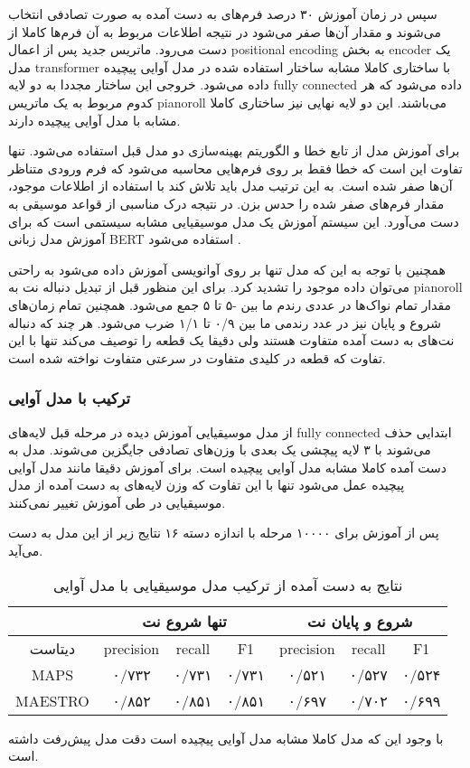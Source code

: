 سپس در زمان آموزش ۳۰ درصد فرم‌های به دست آمده به صورت تصادفی انتخاب می‌شوند و
مقدار آن‌ها صفر می‌شود در نتیجه اطلاعات مربوط به آن فرم‌ها کاملا از دست می‌رود.
ماتریس جدید پس از اعمال \gls{positional encoding} به بخش \gls{encoder} یک مدل
\gls{transformer} با ساختاری کاملا مشابه ساختار استفاده شده در مدل آوایی پیچیده
داده می‌شود. خروجی این ساختار مجددا به دو لایه \gls{fully connected} داده می‌شود
که هر کدوم مربوط به یک ماتریس \gls{pianoroll} می‌باشند. این دو لایه نهایی نیز
ساختاری کاملا مشابه با مدل آوایی پیچیده دارند.

برای آموزش مدل از تابع خطا و الگوریتم بهینه‌سازی دو مدل قبل استفاده می‌شود. تنها
تفاوت این است که خطا فقط بر روی فرم‌هایی محاسبه می‌شود که فرم ورودی متناظر آن‌ها
صفر شده است. به این ترتیب مدل باید تلاش کند با استفاده از اطلاعات موجود، مقدار
فرم‌های صفر شده را حدس بزن. در نتیجه درک مناسبی از قواعد موسیقی به دست می‌آورد.
این سیستم آموزش یک مدل موسیقیایی مشابه سیستمی است که برای آموزش مدل زبانی BERT
استفاده می‌شود \cite{devlin2018bert}.

همچنین با توجه به این که مدل تنها بر روی آوانویسی آموزش داده می‌شود به راحتی
می‌توان داده موجود را تشدید کرد. برای این منظور قبل از تبدیل دنباله نت به
\gls{pianoroll} مقدار تمام نواک‌ها در عددی رندم ما بین -۵ تا ۵ جمع می‌شود.
همچنین تمام زمان‌های شروع و پایان نیز در عدد رندمی ما بین ۰/۹ تا ۱/۱ ضرب می‌شود.
هر چند که دنباله نت‌های به دست آمده متفاوت هستند ولی دقیقا یک قطعه را توصیف
می‌کند تنها با این تفاوت که قطعه در کلیدی متفاوت در سرعتی متفاوت نواخته شده است.

\subsubsection{ترکیب با مدل آوایی}
از مدل موسیقیایی آموزش دیده در مرحله قبل لایه‌های \gls{fully connected} ابتدایی
حذف می‌شوند با ۳ لایه پیچشی یک بعدی با وزن‌های تصادفی جایگزین می‌شوند. مدل به
دست آمده کاملا مشابه مدل آوایی پیچیده است. برای آموزش دقیقا مانند مدل آوایی
پیچیده عمل می‌شود تنها با این تفاوت که وزن لایه‌های به دست آمده از مدل موسیقیایی
در طی آموزش تغییر نمی‌کنند.

پس از آموزش برای ۱۰۰۰۰ مرحله با اندازه دسته ۱۶ نتایج زیر از این مدل به دست
می‌آید.
\begin{table}[ht]
    \centering
    \begin{tabular}{|c|c|c|c|c|c|c|}
        \hline
        & \multicolumn{3}{|c|}{تنها شروع نت} & \multicolumn{3}{|c|}{شروع و پایان نت} \\
        \hline
        دیتاست & \gls{precision} & \gls{recall} & F1 & \gls{precision} & \gls{recall} & F1 \\
        \hline
        MAPS & ۰/۷۳۲ & ۰/۷۳۱ & ۰/۷۳۱ & ۰/۵۲۱ & ۰/۵۲۷ & ۰/۵۲۴ \\
        \hline
        MAESTRO & ۰/۸۵۲ & ۰/۸۵۱ & ۰/۸۵۱ & ۰/۶۹۷ & ۰/۷۰۲ & ۰/۶۹۹ \\
        \hline
    \end{tabular}
    \caption{نتایج به دست آمده از ترکیب مدل موسیقیایی با مدل آوایی}
\end{table}

با وجود این که مدل کاملا مشابه مدل آوایی پیچیده است دقت مدل پیش‌رفت داشته است.